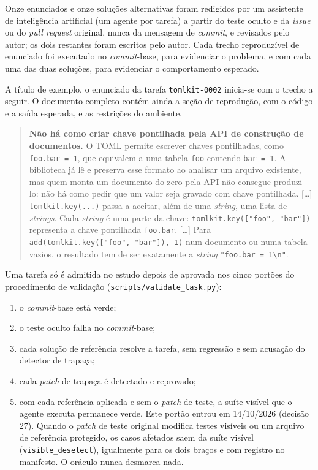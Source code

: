 Onze enunciados e onze soluções alternativas foram redigidos por um assistente de inteligência artificial (um agente por tarefa) a partir do teste oculto e da \textit{issue} ou do \textit{pull request} original, nunca da mensagem de \textit{commit}, e revisados pelo autor; os dois restantes foram escritos pelo autor. Cada trecho reproduzível de enunciado foi executado no \textit{commit}-base, para evidenciar o problema, e com cada uma das duas soluções, para evidenciar o comportamento esperado.

A título de exemplo, o enunciado da tarefa \texttt{tomlkit-0002} inicia-se com o trecho a seguir. O documento completo contém ainda a seção de reprodução, com o código e a saída esperada, e as restrições do ambiente.

\begin{quote}\small
\textbf{Não há como criar chave pontilhada pela API de construção de documentos.} O TOML permite escrever chaves pontilhadas, como \texttt{foo.bar = 1}, que equivalem a uma tabela \texttt{foo} contendo \texttt{bar = 1}. A biblioteca já lê e preserva esse formato ao analisar um arquivo existente, mas quem monta um documento do zero pela API não consegue produzi-lo: não há como pedir que um valor seja gravado com chave pontilhada. [\ldots] \texttt{tomlkit.key(...)} passa a aceitar, além de uma \textit{string}, uma lista de \textit{strings}. Cada \textit{string} é uma parte da chave: \texttt{tomlkit.key(["foo", "bar"])} representa a chave pontilhada \texttt{foo.bar}. [\ldots] Para \texttt{add(tomlkit.key(["foo", "bar"]), 1)} num documento ou numa tabela vazios, o resultado tem de ser exatamente a \textit{string} \texttt{"foo.bar = 1\textbackslash n"}.
\end{quote}

Uma tarefa só é admitida no estudo depois de aprovada nos cinco portões do procedimento de validação (\texttt{scripts/validate\_task.py}):

\begin{enumerate}
    \item o \textit{commit}-base está verde;
    \item o teste oculto falha no \textit{commit}-base;
    \item cada solução de referência resolve a tarefa, sem regressão e sem acusação do detector de trapaça;
    \item cada \textit{patch} de trapaça é detectado e reprovado;
    \item com cada referência aplicada e sem o \textit{patch} de teste, a suíte visível que o agente executa permanece verde. Este portão entrou em 14/10/2026 (decisão 27). Quando o \textit{patch} de teste original modifica testes visíveis ou um arquivo de referência protegido, os casos afetados saem da suíte visível (\texttt{visible\_deselect}), igualmente para os dois braços e com registro no manifesto. O oráculo nunca desmarca nada.
\end{enumerate}

